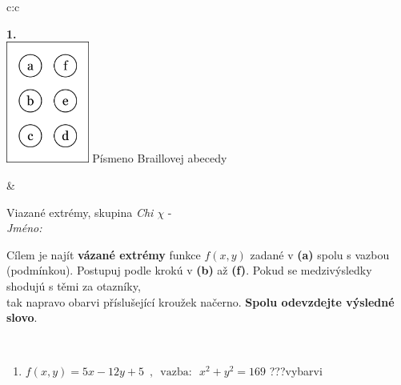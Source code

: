 \documentclass[10pt]{report}
\begin{document}
\begin{tabular}{c:c}
\begin{minipage}[c][104.5mm][t]{0.5\linewidth}
\begin{center}
\begin{minipage}{0.79\linewidth}
\begin{center}
\begin{varwidth}{\linewidth}
\begin{enumerate}
\end{enumerate}
\end{varwidth}
\end{center}
\end{minipage}
\begin{minipage}{0.20\linewidth}
\begin{center}
{\Huge\bfseries 1.} \\[2mm]
\includegraphics[height=40mm]{../images/braille.png}
{\small Písmeno Braillovej abecedy}
\end{center}
\end{minipage}
\end{center}
\end{minipage}
&
\begin{minipage}[c][104.5mm][t]{0.5\linewidth}
\begin{center}
\vspace{7mm}
{\huge Viazané extrémy, skupina \textit{Chi $\chi$} -}\\[5mm]
\textit{Jméno:}\phantom{xxxxxxxxxxxxxxxxxxxxxxxxxxxxxxxxxxxxxxxxxxxxxxxxxxxxxxxxxxxxxxxxx}\\[5mm]
\begin{minipage}{0.95\linewidth}
\begin{center}
Cílem je najít \textbf{vázané extrémy} funkce $f(x,y)$ zadané v \textbf{(a)} spolu s vazbou (podmínkou). Postupuj podle krokú v \textbf{(b)} až \textbf{(f)}. Pokud se medzivýsledky shodujú s těmi za otazníky,\\tak napravo obarvi příslušející kroužek načerno. \textbf{Spolu odevzdejte výsledné slovo}.
\end{center}
\end{minipage}
\\[1mm]
\begin{minipage}{0.79\linewidth}
\begin{center}
\begin{varwidth}{\linewidth}
\begin{enumerate}
\normalsize
\item $f(x,y)=5x-12y+5 \enspace , \enspace \mathrm{vazba:} \enspace x^2+y^2=169$\quad \dotfill\; ???\;\dotfill \quad vybarvi

\end{enumerate}
\end{varwidth}
\end{center}
\end{minipage}
\end{center}
\end{minipage}
\end{tabular}
\end{document}
